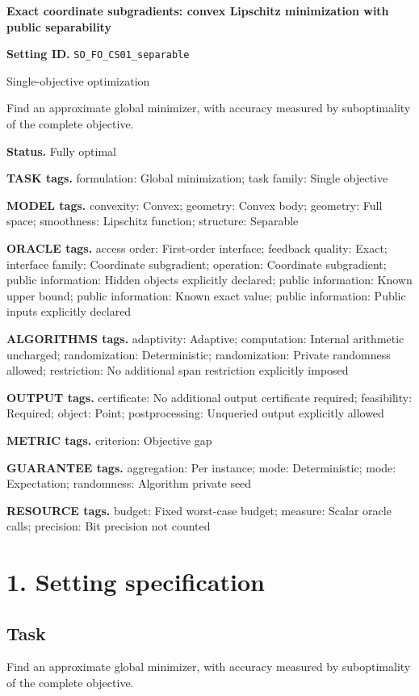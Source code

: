 \documentclass[10pt,a4paper]{article}
\begin{document}
\raggedright

{\LARGE\bfseries\sffamily\color{AtlasNavy} Exact coordinate subgradients: convex Lipschitz minimization with public separability\par}\vspace{5pt}
\textbf{Setting ID.} \texttt{SO\_\allowbreak{}FO\_\allowbreak{}CS01\_\allowbreak{}separable}

Single-objective optimization

Find an approximate global minimizer, with accuracy measured by suboptimality of the complete objective.

\textbf{Status.} Fully optimal

\textbf{TASK tags.} formulation: Global minimization; task family: Single objective

\textbf{MODEL tags.} convexity: Convex; geometry: Convex body; geometry: Full space; smoothness: Lipschitz function; structure: Separable

\textbf{ORACLE tags.} access order: First-order interface; feedback quality: Exact; interface family: Coordinate subgradient; operation: Coordinate subgradient; public information: Hidden objects explicitly declared; public information: Known upper bound; public information: Known exact value; public information: Public inputs explicitly declared

\textbf{ALGORITHMS tags.} adaptivity: Adaptive; computation: Internal arithmetic uncharged; randomization: Deterministic; randomization: Private randomness allowed; restriction: No additional span restriction explicitly imposed

\textbf{OUTPUT tags.} certificate: No additional output certificate required; feasibility: Required; object: Point; postprocessing: Unqueried output explicitly allowed

\textbf{METRIC tags.} criterion: Objective gap

\textbf{GUARANTEE tags.} aggregation: Per instance; mode: Deterministic; mode: Expectation; randomness: Algorithm private seed

\textbf{RESOURCE tags.} budget: Fixed worst-case budget; measure: Scalar oracle calls; precision: Bit precision not counted

\section{1. Setting specification}
\subsection{Task}
Find an approximate global minimizer, with accuracy measured by suboptimality of the complete objective.
\end{document}
